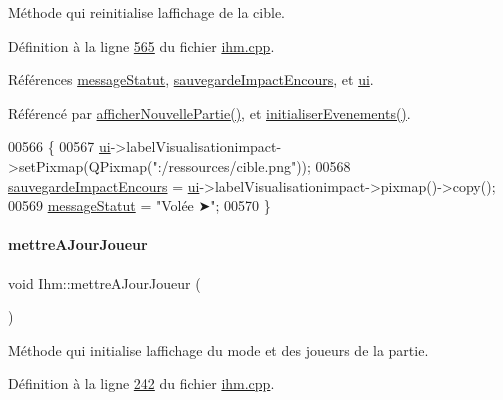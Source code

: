 Méthode qui reinitialise l\textquotesingle{}affichage de la cible. 



Définition à la ligne \hyperlink{ihm_8cpp_source_l00565}{565} du fichier \hyperlink{ihm_8cpp_source}{ihm.\+cpp}.



Références \hyperlink{ihm_8h_source_l00061}{message\+Statut}, \hyperlink{ihm_8h_source_l00060}{sauvegarde\+Impact\+Encours}, et \hyperlink{ihm_8h_source_l00052}{ui}.



Référencé par \hyperlink{ihm_8cpp_source_l00383}{afficher\+Nouvelle\+Partie()}, et \hyperlink{ihm_8cpp_source_l00075}{initialiser\+Evenements()}.


\begin{DoxyCode}
00566 \{
00567     \hyperlink{class_ihm_a0ac5f47856566ceeeca1720109bf70ea}{ui}->labelVisualisationimpact->setPixmap(QPixmap(\textcolor{stringliteral}{":/ressources/cible.png"}));
00568     \hyperlink{class_ihm_a659c67bf5d1ba3104fb10f23d8b91b37}{sauvegardeImpactEncours} = \hyperlink{class_ihm_a0ac5f47856566ceeeca1720109bf70ea}{ui}->labelVisualisationimpact->pixmap()->copy();
00569     \hyperlink{class_ihm_a31a25b36e5560142cb156b8b1a25965f}{messageStatut} = \textcolor{stringliteral}{"Volée ➤"};
00570 \}
\end{DoxyCode}
\mbox{\label{class_ihm_aaeeb08a39f940e58da194768763dc00b}} 
\paragraph{\texorpdfstring{mettre\+A\+Jour\+Joueur}{mettreAJourJoueur}}
{\footnotesize\ttfamily void Ihm\+::mettre\+A\+Jour\+Joueur (\begin{DoxyParamCaption}{ }\end{DoxyParamCaption})\hspace{0.3cm}{\ttfamily [slot]}}



Méthode qui initialise l\textquotesingle{}affichage du mode et des joueurs de la partie. 



Définition à la ligne \hyperlink{ihm_8cpp_source_l00242}{242} du fichier \hyperlink{ihm_8cpp_source}{ihm.\+cpp}.




